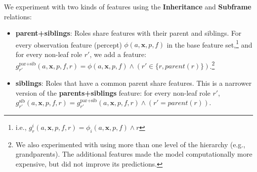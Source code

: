 \documentclass[11pt,a4paper]{article}
\newcommand{\exemplars}{\mathrm{ex}}
\newcommand{\fulltext}{\mathrm{ft}}
\begin{document}
We experiment with two kinds of features using the \textbf{Inheritance} and \textbf{Subframe} relations:

\begin{itemize}
\item\noindent\textbf{parent+siblings}: Roles share features with their parent and siblings. 
For every observation feature (percept) $\phi(a, \mathbf{x}, p, f)$ 
in the base feature set,\footnote{i.e., $g^i_r(a,\mathbf{x},p,f,r) = \phi_i(a,\mathbf{x},p,f) \wedge r$} 
and for every non-leaf role $r'$, we add a feature:
$g^{\text{par+sib}}_{r'}(a,\mathbf{x},p,f,r) = \phi(a, \mathbf{x}, p, f) \wedge \left(r' \in \{r, \textit{parent}(r)\}\right)$.\footnote{We also experimented with using more than one level of the hierarchy (e.g., grandparents). 
The additional features made the model computationally more expensive, 
but did not improve its predictions.}
\item\noindent\textbf{siblings}: Roles that have a common parent share features.
This is a narrower version of the \textbf{parents+siblings} 
feature: for every non-leaf role $r'$,
$g^{\text{sib}}_{r'}(a,\mathbf{x},p,f,r) = g^{\text{par+sib}}_{r'}(a,\mathbf{x},p,f,r) \wedge \left(r'=\textit{parent}(r)\right)$.
\end{itemize}




% 
\end{document}
